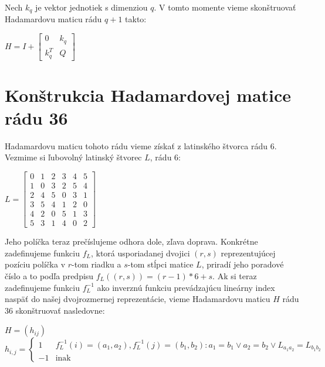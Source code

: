 Nech $k_q$ je vektor jednotiek s dimenziou $q$. V tomto momente vieme skonštruovať Hadamardovu maticu rádu $q+1$ takto:


\begin{center}
$H = I + \begin{bmatrix}
0 & k_q \\
k_q^T & Q
\end{bmatrix}$
\end{center}

\section{Konštrukcia Hadamardovej matice rádu 36}

Hadamardovu maticu tohoto rádu vieme získať z latinského štvorca rádu 6. Vezmime si ľubovolný latinský štvorec $L$, rádu 6:

\begin{center}
$L = \begin{bmatrix}
0 & 1 & 2 & 3 & 4 & 5\\
1 & 0 & 3 & 2 & 5 & 4\\
2 & 4 & 5 & 0 & 3 & 1\\
3 & 5 & 4 & 1 & 2 & 0\\
4 & 2 & 0 & 5 & 1 & 3\\
5 & 3 & 1 & 4 & 0 & 2
\end{bmatrix}$
\end{center}


Jeho políčka teraz prečíslujeme odhora dole, zľava doprava. Konkrétne zadefinujeme funkciu $f_L$, ktorá usporiadanej dvojici $(r, s)$ reprezentujúcej pozíciu políčka v $r$-tom riadku a $s$-tom stĺpci matice $L$, priradí jeho poradové číslo a to podľa predpisu $f_L((r, s)) = (r-1)*6+s$. Ak si teraz zadefinujeme funkciu $f_L^{-1}$ ako inverznú funkciu prevádzajúcu lineárny index naspäť do našej dvojrozmernej reprezentácie, vieme Hadamardovu maticu $H$ rádu 36 skonštruovať nasledovne:

\begin{center}
$H = (h_{ij})$
\begin{equation*}
    h_{i, j} = \begin{cases}
               1               & f_L^{-1}(i) = (a_1, a_2), f_L^{-1}(j) = (b_1, b_2): a_1=b_1 \lor a_2=b_2 \lor L_{a_1a_2} = L_{b_1b_2}   \\
               -1              & \text{inak}
           \end{cases}
\end{equation*}
\end{center}


